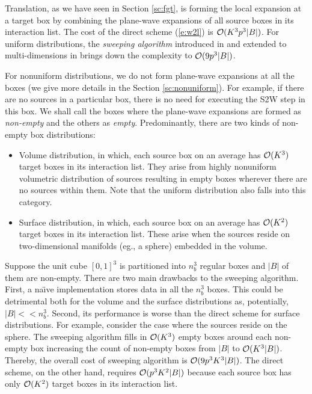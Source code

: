 Translation, as we have seen in Section \ref{sc:fgt}, is forming the local expansion at a target box by combining the plane-wave expansions of all source boxes in its interaction list.  The cost of the direct scheme (\ref{e:w2l}) is $\mathcal{O}(K^3 p^3 |B|)$. For uniform distributions, the {\em sweeping algorithm} introduced in \cite{greengard98} and extended to multi-dimensions in \cite{fggt} brings down the complexity to $\mathcal{O}(9p^3 |B|)$. 

For nonuniform distributions, we do not form plane-wave expansions at all the boxes (we give more details in the Section \ref{sc:nonuniform}). For example, if there are no sources in a particular box, there is no need for executing the S2W step in this box. We shall call the boxes where the plane-wave expansions are formed as {\em non-empty} and the others as {\em empty}. Predominantly, there are two kinds of non-empty box distributions:
%
\begin{itemize}
 \item Volume distribution, in which, each source box on an average has $\mathcal{O}(K^3)$ target boxes in its interaction list.  They arise from highly nonuniform volumetric distribution of sources resulting in empty boxes wherever there are no sources within them. Note that the uniform distribution also falls into this category.
 
 \item Surface distribution, in which, each source box on an average has $\mathcal{O}(K^2)$ target boxes in its interaction list. These arise when the sources reside on two-dimensional manifolds (eg., a sphere) embedded in the volume. 
\end{itemize}

Suppose the unit cube $[0, 1]^3$ is partitioned into $n_b^3$ regular boxes and $|B|$ of them are non-empty. There are two main drawbacks to the sweeping algorithm. First, a na\"{\i}ve implementation stores data in all the $n_b^3$ boxes. This could be detrimental both for the volume and the surface distributions as, potentially, $|B| <\!< n_b^3$. Second, its performance is worse than the direct scheme for surface distributions. For example, consider the case where the sources reside on the sphere. The sweeping algorithm fills in $\mathcal{O}(K^3)$ empty boxes around each non-empty box increasing the count of non-empty boxes from $|B|$ to $\mathcal{O}(K^3 |B|)$. Thereby, the overall cost of sweeping algorithm is $\mathcal{O}(9 p^3 K^3 |B|)$. The direct scheme, on the other hand, requires $\mathcal{O}(p^3 K^2 |B|)$ because each source box has only $\mathcal{O}(K^2)$ target boxes in its interaction list. 

